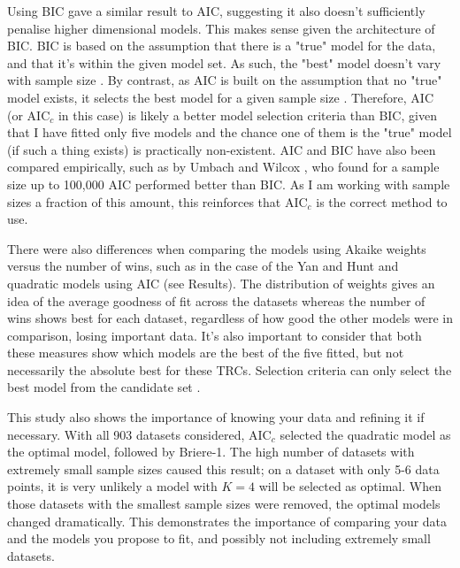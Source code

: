 \documentclass[11pt, a4paper]{article}
\begin{document}
Using BIC gave a similar result to AIC, suggesting it also doesn't sufficiently penalise higher dimensional models. This makes sense given the architecture of BIC. BIC is based on the assumption that there is a "true" model for the data, and that it's within the given model set. As such, the "best" model doesn't vary with sample size \cite{burnhamModelSelectionMultimodel2002, schwarzEstimatingDimensionModel1978}. By contrast, as AIC is built on the assumption that no "true" model exists, it selects the best model for a given sample size \cite{burnhamModelSelectionMultimodel2002}. Therefore, AIC (or AIC$_c$ in this case) is likely a better model selection criteria than BIC, given that I have fitted only five models and the chance one of them is the "true" model (if such a thing exists) is practically non-existent. AIC and BIC have also been compared empirically, such as by Umbach and Wilcox \cite{umbachTechniqueMeasuringEpidemiologically1996}, who found for a sample size up to 100,000 AIC performed better than BIC. As I am working with sample sizes a fraction of this amount, this reinforces that AIC$_c$ is the correct method to use.

There were also differences when comparing the models using Akaike weights versus the number of wins, such as in the case of the Yan and Hunt and quadratic models using AIC (see Results). The distribution of weights gives an idea of the average goodness of fit across the datasets whereas the number of wins shows best for each dataset, regardless of how good the other models were in comparison, losing important data. It's also important to consider that both these measures show which models are the best of the five fitted, but not necessarily the absolute best for these TRCs. Selection criteria can only select the best model from the candidate set \cite{johnsonModelSelectionEcology2004}.

This study also shows the importance of knowing your data and refining it if necessary. With all 903 datasets considered, AIC$_c$ selected the quadratic model as the optimal model, followed by Briere-1. The high number of datasets with extremely small sample sizes caused this result; on a dataset with only 5-6 data points, it is very unlikely a model with $K=4$ will be selected as optimal. When those datasets with the smallest sample sizes were removed, the optimal models changed dramatically. This demonstrates the importance of comparing your data and the models you propose to fit, and possibly not including extremely small datasets.
\end{document}
